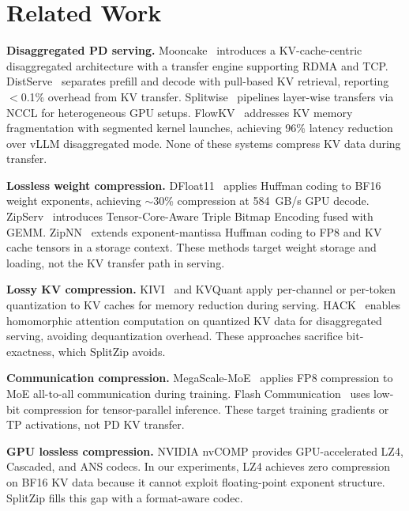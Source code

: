 \section{Related Work}
\label{sec:related}

\textbf{Disaggregated PD serving.}
Mooncake~\cite{mooncake} introduces a KV-cache-centric disaggregated architecture with a transfer engine supporting RDMA and TCP.
DistServe~\cite{distserve} separates prefill and decode with pull-based KV retrieval, reporting $<$0.1\% overhead from KV transfer.
Splitwise~\cite{splitwise} pipelines layer-wise transfers via NCCL for heterogeneous GPU setups.
FlowKV~\cite{flowkv} addresses KV memory fragmentation with segmented kernel launches, achieving 96\% latency reduction over vLLM disaggregated mode.
None of these systems compress KV data during transfer.

\textbf{Lossless weight compression.}
DFloat11~\cite{dfloat11} applies Huffman coding to BF16 weight exponents, achieving $\sim$30\% compression at 584~GB/s GPU decode.
ZipServ~\cite{zipserv} introduces Tensor-Core-Aware Triple Bitmap Encoding fused with GEMM.
ZipNN~\cite{zipnn} extends exponent-mantissa Huffman coding to FP8 and KV cache tensors in a storage context.
These methods target weight storage and loading, not the KV transfer path in serving.

\textbf{Lossy KV compression.}
KIVI~\cite{kivi} and KVQuant apply per-channel or per-token quantization to KV caches for memory reduction during serving.
HACK~\cite{hack} enables homomorphic attention computation on quantized KV data for disaggregated serving, avoiding dequantization overhead.
These approaches sacrifice bit-exactness, which SplitZip avoids.

\textbf{Communication compression.}
MegaScale-MoE~\cite{megascalemoe} applies FP8 compression to MoE all-to-all communication during training.
Flash Communication~\cite{flashcomm} uses low-bit compression for tensor-parallel inference.
These target training gradients or TP activations, not PD KV transfer.

\textbf{GPU lossless compression.}
NVIDIA nvCOMP provides GPU-accelerated LZ4, Cascaded, and ANS codecs.
In our experiments, LZ4 achieves zero compression on BF16 KV data because it cannot exploit floating-point exponent structure.
SplitZip fills this gap with a format-aware codec.
